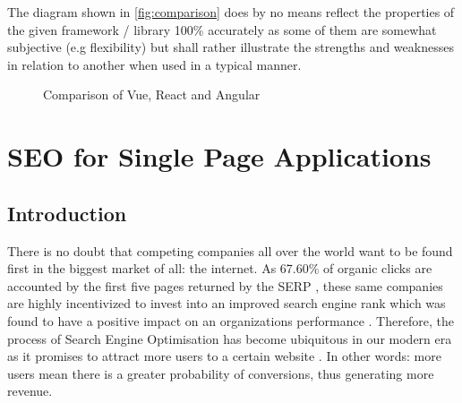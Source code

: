 The diagram shown in \autoref{fig:comparison} does by no means reflect the properties of the given framework / library 100\% accurately as some of them are somewhat subjective (e.g flexibility) but shall rather illustrate the strengths and weaknesses in relation to another when used in a typical manner.

\newcommand\ColorBox[1]{\textcolor{#1}{\rule{2ex}{2ex}}}

\begin{figure}[H]
\begin{center}
\end{center}
\caption{Comparison of Vue, React and Angular}
\label{fig:comparison}
\end{figure}


\section{SEO for Single Page Applications} \label{sec:seo}

\subsection{Introduction}
There is no doubt that competing companies all over the world want to be found first in the biggest market of all: the internet. As 67.60\% of organic clicks are accounted by the first five pages returned by the SERP \cite{Khan2018:article}, these same companies are highly incentivized to invest into an improved search engine rank which was found to have a positive impact on an organizations performance \cite{yang2015search:article}. Therefore, the process of Search Engine Optimisation has become ubiquitous in our modern era as it promises to attract more users to a certain website \cite{Khan2018:article}. In other words: more users mean there is a greater probability of conversions, thus generating more revenue.

